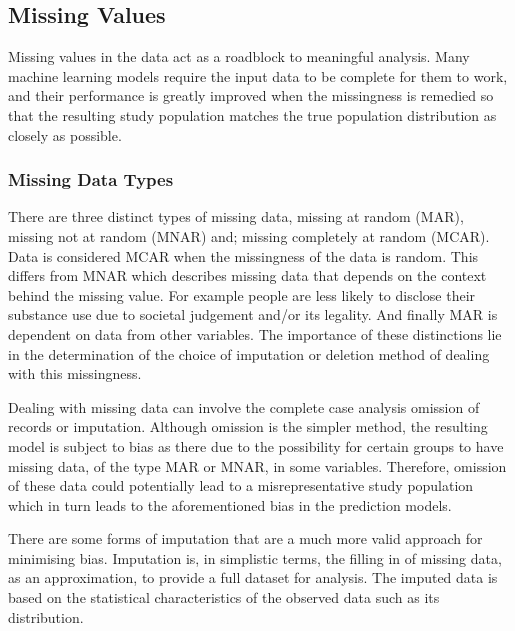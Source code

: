 \documentclass[11pt]{article}
\begin{document}
\subsection{Missing Values}
Missing values in the data act as a roadblock to meaningful analysis. Many machine learning models require the input data to be complete for them to work, and their performance is greatly improved when the missingness is remedied so that the resulting study population matches the true population distribution as closely as possible\cite{Hasan2021}.

\subsubsection{Missing Data Types}
There are three distinct types of missing data, missing at random (MAR), missing not at random (MNAR) and; missing completely at random (MCAR). Data is considered MCAR when the missingness of the data is random\cite{Mack2018}. This differs from MNAR which describes missing data that depends on the context behind the missing value. For example people are less likely to disclose their substance use due to societal judgement and/or its legality. And finally MAR is dependent on data from other variables\cite{Yan2025}. The importance of these distinctions lie in the determination of the choice of imputation or deletion method of dealing with this missingness.

Dealing with missing data can involve the complete case analysis omission of records or imputation. Although omission is the simpler method, the resulting model is subject to bias as there due to the possibility for certain groups to have missing data, of the type MAR or MNAR, in some variables\cite{Kang2013}. Therefore, omission of these data could potentially lead to a misrepresentative study population which in turn leads to the aforementioned bias in the prediction models\cite{Peng2023}.

There are some forms of imputation that are a much more valid approach for minimising bias. Imputation is, in simplistic terms, the filling in of missing data, as an approximation, to provide a full dataset for analysis. The imputed data is based on the statistical characteristics of the observed data such as its distribution. 

\end{document}
